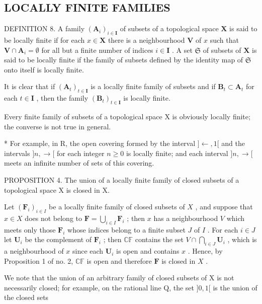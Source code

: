 \subsection{LOCALLY FINITE FAMILIES}

DEFINITION 8. A family \((\mathbf{A}_{i})_{i\in \mathbf{I}}\) of subsets of a topological space \(\mathbf{X}\) is said to be locally finite if for each \(x\in \mathbf{X}\) there is a neighbourhood \(\mathbf{V}\) of \(x\) such that \(\mathbf{V}\cap \mathbf{A}_i = \emptyset\) for all but a finite number of indices \(i\in \mathbf{I}\) . A set \(\mathfrak{S}\) of subsets of \(\mathbf{X}\) is said to be locally finite if the family of subsets defined by the identity map of \(\mathfrak{S}\) onto itself is locally finite.

It is clear that if \((\mathbf{A}_t)_{t \in \mathbf{I}}\) is a locally finite family of subsets and if \(\mathbf{B}_t \subset \mathbf{A}_t\) for each \(t \in \mathbf{I}\) , then the family \((\mathbf{B}_t)_{t \in \mathbf{I}}\) is locally finite.

Every finite family of subsets of a topological space X is obviously locally finite; the converse is not true in general.

* For example, in R, the open covering formed by the interval \(]\leftarrow, 1[\) and the intervals \(]n, \rightarrow[\) for each integer \(n\geqslant0\) is locally finite; and each interval \(]n, \rightarrow[\) meets an infinite number of sets of this covering.

PROPOSITION 4. The union of a locally finite family of closed subsets of a topological space X is closed in X.

Let \((\mathbf{F}_i)_{i\in I}\) be a locally finite family of closed subsets of \(X\) , and suppose that \(x\in X\) does not belong to \(\mathbf{F} = \bigcup_{i\in I}\mathbf{F}_i\) ; then \(x\) has a neighbourhood \(V\) which meets only those \(\mathbf{F}_i\) whose indices belong to a finite subset \(J\) of \(I\) . For each \(i\in J\) let \(\mathbf{U}_i\) be the complement of \(\mathbf{F}_i\) ; then \(\mathbb{CF}\) contains the set \(V\cap \bigcap_{i\in J}\mathbf{U}_i\) , which is a neighbourhood of \(x\) since each \(\mathbf{U}_i\) is open and contains \(x\) . Hence, by Proposition 1 of no. 2, \(\mathbb{CF}\) is open and therefore \(\mathbf{F}\) is closed in \(X\) .

We note that the union of an arbitrary family of closed subsets of X is not necessarily closed; for example, on the rational line Q, the set \(]0, 1[\) is the union of the closed sets

